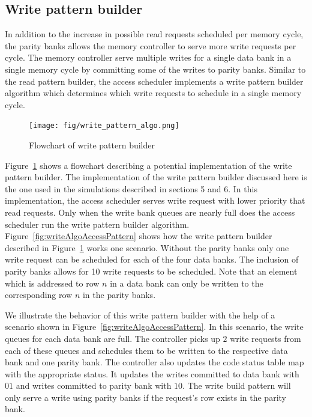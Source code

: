 \subsection{Write pattern builder}
\label{sec:writeCodingAlgo}
In addition to the increase in possible read requests scheduled per memory cycle, the parity banks allows the memory controller to serve more write requests per cycle. The memory controller serve multiple writes for a single data bank in a single memory cycle by committing some of the writes to parity banks. Similar to the read pattern builder, the access scheduler implements a write pattern builder algorithm which determines which write requests to schedule in a single memory cycle. 

\begin{figure}[htbp]
\centering
	\texttt{[image: fig/write\_pattern\_algo.png]}
	\caption{{ Flowchart of write pattern builder}}
	\label{fig:writeFlow}
\end{figure}

Figure~\ref{fig:writeFlow} shows a flowchart describing a potential implementation of the write pattern builder. The implementation of the write pattern builder discussed here is the one used in the simulations described in sections 5 and 6. In this implementation, the access scheduler serves write request with lower priority that read requests. Only when the write bank queues are nearly full does the access scheduler run the write pattern builder algorithm. Figure~\ref{fig:writeAlgoAccessPattern} shows how the write pattern builder described in Figure~\ref{fig:writeFlow} works one scenario. Without the parity banks only one write request can be scheduled for each of the four data banks. The inclusion of parity banks allows for 10 write requests to be scheduled. Note that an element which is addressed to row $n$ in a data bank can only be written to the corresponding row $n$ in the parity banks. 

We illustrate the behavior of this write pattern builder with the help of a scenario shown in Figure~\ref{fig:writeAlgoAccessPattern}. In this scenario, the write queues for each data bank are full. The controller picks up $2$ write requests from each of these queues and schedules them to be written to the respective data bank and one parity bank. The controller also updates the code status table map with the appropriate status. It updates the writes committed to data bank with $01$ and writes committed to parity bank with $10$. The write build pattern will only serve a write using parity banks if the request's row exists in the parity bank. 

